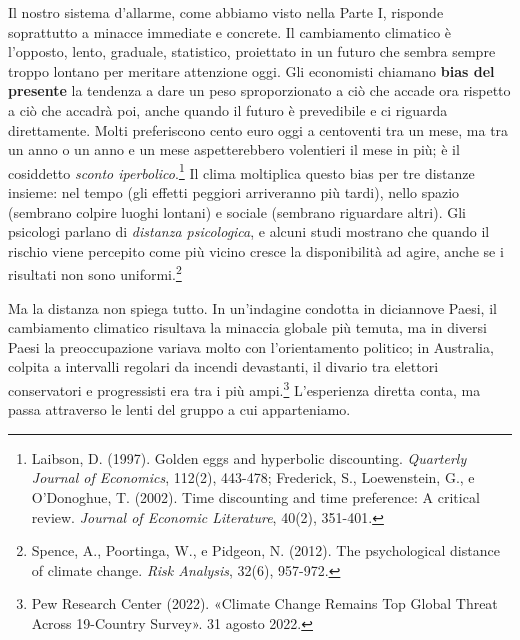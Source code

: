 Il nostro sistema d'allarme, come abbiamo visto nella Parte I, risponde soprattutto a minacce immediate e concrete. Il cambiamento climatico \`{e} l'opposto, lento, graduale, statistico, proiettato in un futuro che sembra sempre troppo lontano per meritare attenzione oggi. Gli economisti chiamano \textbf{bias del presente} la tendenza a dare un peso sproporzionato a ciò che accade ora rispetto a ciò che accadrà poi, anche quando il futuro è prevedibile e ci riguarda direttamente. Molti preferiscono cento euro oggi a centoventi tra un mese, ma tra un anno o un anno e un mese aspetterebbero volentieri il mese in più; è il cosiddetto \textit{sconto iperbolico}.\footnote{Laibson, D. (1997). Golden eggs and hyperbolic discounting. \textit{Quarterly Journal of Economics}, 112(2), 443-478; Frederick, S., Loewenstein, G., e O'Donoghue, T. (2002). Time discounting and time preference: A critical review. \textit{Journal of Economic Literature}, 40(2), 351-401.} Il clima moltiplica questo bias per tre distanze insieme: nel tempo (gli effetti peggiori arriveranno più tardi), nello spazio (sembrano colpire luoghi lontani) e sociale (sembrano riguardare altri). Gli psicologi parlano di \textit{distanza psicologica}, e alcuni studi mostrano che quando il rischio viene percepito come più vicino cresce la disponibilità ad agire, anche se i risultati non sono uniformi.\footnote{Spence, A., Poortinga, W., e Pidgeon, N. (2012). The psychological distance of climate change. \textit{Risk Analysis}, 32(6), 957-972.}

Ma la distanza non spiega tutto. In un'indagine condotta in diciannove Paesi, il cambiamento climatico risultava la minaccia globale più temuta, ma in diversi Paesi la preoccupazione variava molto con l'orientamento politico; in Australia, colpita a intervalli regolari da incendi devastanti, il divario tra elettori conservatori e progressisti era tra i più ampi.\footnote{Pew Research Center (2022). «Climate Change Remains Top Global Threat Across 19-Country Survey». 31 agosto 2022.} L'esperienza diretta conta, ma passa attraverso le lenti del gruppo a cui apparteniamo.

